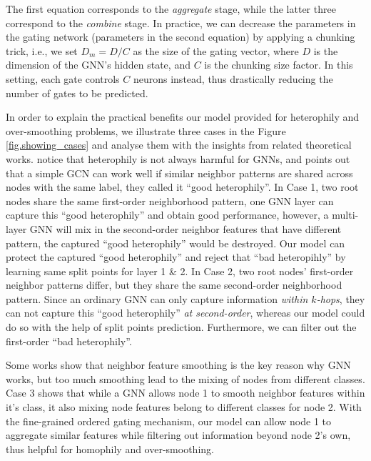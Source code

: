 \documentclass{article}
\begin{document}
The first equation corresponds to the \textit{aggregate} stage, while the latter three correspond to the \textit{combine} stage. In practice, we can decrease the parameters in the gating network (parameters in the second equation) by applying a chunking trick, i.e., we set $D_{m}=D/C$ as the size of the gating vector, where $D$ is the dimension of the GNN's hidden state, and $C$ is the chunking size factor. In this setting, each gate controls $C$ neurons instead, thus drastically reducing the number of gates to be predicted.


In order to explain the practical benefits our model provided for heterophily and over-smoothing problems, we illustrate three cases in the Figure \ref{fig.showing_cases} and analyse them with the insights from related theoretical works. \citet{luan2021heterophily,ma2021homophily} notice that heterophily is not always harmful for GNNs, and \citet{ma2021homophily} points out that a simple GCN can work well if similar neighbor patterns are shared across nodes with the same label, they called it ``good heterophily''.
In Case 1, two root nodes share the same first-order neighborhood pattern, one GNN layer can capture this ``good heterophily'' and obtain good performance, however, a multi-layer GNN will mix in the second-order neighbor features that have different pattern, the captured ``good heterophily'' would be destroyed. Our model can protect the captured ``good heterophily'' and reject that ``bad heteropihly'' by learning same split points for layer 1 \& 2.
In Case 2, two root nodes' first-order neighbor patterns differ, but they share the same second-order neighborhood pattern. Since an ordinary GNN can only capture information \textit{within $k$-hops}, they can not capture this ``good heterophily'' \textit{at second-order}, whereas our model could do so with the help of split points prediction. Furthermore, we can filter out the first-order ``bad heterophily''.

Some works \citep{li2018deeper,chen2020measuring,ma2021homophily} show that neighbor feature smoothing is the key reason why GNN works, but too much smoothing lead to the mixing of nodes from different classes. Case 3 shows that while a GNN allows node 1 to smooth neighbor features within it's class, it also mixing node features belong to different classes for node 2. With the fine-grained ordered gating mechanism, our model can allow node 1 to aggregate similar features while filtering out information beyond node 2's own, thus helpful for homophily and over-smoothing.
\end{document}

